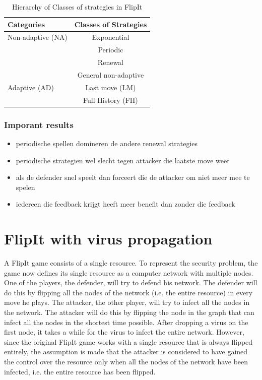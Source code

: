 \documentclass[journal,a4paper]{IEEEtran}
\begin{document}
 \begin{table}
 \centering
 \begin{tabular}{ l | c  }
  \textbf{Categories} & \textbf{Classes of Strategies} \\
  \hline Non-adaptive (NA) & Exponential \\
  & Periodic \\
  & Renewal \\
  & General non-adaptive \\
  \hline Adaptive (AD) & Last move (LM) \\
  & Full History (FH) \\  
\end{tabular}
 \caption{Hierarchy of Classes of strategies in FlipIt}
 \label{table:Strategies}
 \end{table}




\subsubsection{Imporant results}

\begin{itemize}
\item periodische spellen domineren de andere renewal strategies
\item periodische strategien wel slecht tegen attacker die laatste move weet
\item als de defender snel speelt dan forceert die de attacker om niet meer mee te spelen
\item iedereen die feedback krijgt heeft meer benefit dan zonder die feedback
\end{itemize}
 


\section{FlipIt with virus propagation}
A FlipIt game consists of a single resource. To represent the security problem, the game now defines its single resource as a computer network with multiple
nodes. One of the players, the defender, will try to defend his network. The defender
will do this by flipping all the nodes of the network (i.e. the entire resource) in every move he plays. The
attacker, the other player, will try to infect all the nodes in the network. The attacker
will do this by flipping the node in the graph that can infect all the nodes in the
shortest time possible. After dropping a virus on the first node, it takes a while for the virus to infect the entire network. However, since the original FlipIt game works with a single resource that is always flipped entirely, the assumption is made that the attacker is considered to have gained the control over the resource only when all the nodes of the network have been infected, i.e. the entire resource has been flipped.\\
\end{document}
